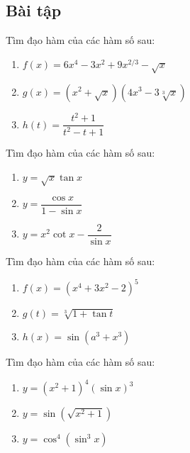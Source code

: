 \subsection{Bài tập}

\begin{exercise}
    Tìm đạo hàm của các hàm số sau:
    \begin{enumerate}[label=(\alph*)]
        \item $f(x) = 6x^4 - 3x^2 + 9x^{2/3} - \sqrt{x}$
        \item $g(x) = (x^2 + \sqrt{x})(4x^3 - 3\sqrt[3]{x})$
        \item $h(t) = \dfrac{t^2+1}{t^2-t+1}$
    \end{enumerate}
\end{exercise}

\begin{exercise}
    Tìm đạo hàm của các hàm số sau:
    \begin{enumerate}[label=(\alph*)]
        \item $y = \sqrt{x}\tan x$
        \item $y = \dfrac{\cos x}{1-\sin x}$
        \item $y = x^2 \cot x - \dfrac{2}{\sin x}$
    \end{enumerate}
\end{exercise}

\begin{exercise}
    Tìm đạo hàm của các hàm số sau:
    \begin{enumerate}[label=(\alph*)]
        \item $f(x) = (x^4 + 3x^2 - 2)^{5}$
        \item $g(t) = \sqrt[3]{1 + \tan t}$
        \item $h(x) = \sin(a^3+x^3)$
    \end{enumerate}
\end{exercise}

\begin{exercise}
    Tìm đạo hàm của các hàm số sau:
    \begin{enumerate}[label=(\alph*)]
        \item $y = (x^2+1)^4 (\sin x)^3$
        \item $y = \sin(\sqrt{x^2+1})$
        \item $y = \cos^4(\sin^3 x)$
    \end{enumerate}
\end{exercise}

